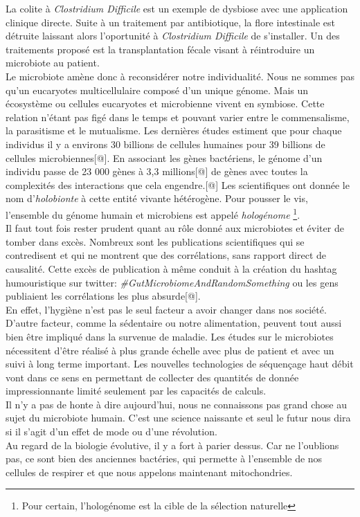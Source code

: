 \documentclass[12pt,a4paper]{article}
\begin{document}
La colite à \textit{Clostridium Difficile} est un exemple de dysbiose avec une application clinique directe. Suite à un traitement par antibiotique, la flore intestinale est détruite laissant alors l'oportunité à \textit{Clostridium Difficile} de s'installer. Un des traitements proposé est la transplantation fécale visant à réintroduire un microbiote au patient. \\
Le microbiote amène donc à reconsidérer notre individualité. Nous ne sommes pas qu’un eucaryotes multicellulaire composé d’un unique génome. Mais un écosystème ou cellules eucaryotes et microbienne vivent en symbiose. Cette relation n'étant pas figé dans le temps et pouvant varier entre le commensalisme, la parasitisme et le mutualisme. Les dernières études estiment que pour chaque individus il y a environs 30 billions de cellules humaines pour 39 billions de cellules microbiennes[@]. En associant les gènes bactériens, le génome d’un individu passe de 23 000 gènes à 3,3 millions[@] de gènes avec toutes la complexités des interactions que cela engendre.[@] Les scientifiques ont donnée le nom d’\textit{holobionte} à cette entité vivante hétérogène. Pour pousser le vis, l'ensemble du génome humain et microbiens est appelé \textit{hologénome} \footnote{Pour certain, l'hologénome est la cible de la sélection naturelle}. \\
Il faut tout fois rester prudent quant au rôle donné aux microbiotes et éviter de tomber dans excès. Nombreux sont les publications scientifiques qui se contredisent et qui ne montrent que des corrélations, sans rapport direct de causalité. Cette excès de publication à même conduit à la création du hashtag humouristique sur twitter: \textit{\#GutMicrobiomeAndRandomSomething} ou les gens publiaient les corrélations les plus absurde[@]. \\
En effet, l'hygiène n'est pas le seul facteur a avoir changer dans nos société. D'autre facteur, comme la sédentaire ou notre alimentation, peuvent tout aussi bien être impliqué dans la survenue de maladie.
Les études sur le microbiotes nécessitent d'être réalisé à plus grande échelle avec plus de patient et avec un suivi à long terme important. Les nouvelles technologies de séquençage haut débit vont dans ce sens en permettant de collecter des quantités de donnée impressionnante limité seulement par les capacités de calculs. \\
Il n’y a pas de honte à dire aujourd'hui, nous ne connaissons pas grand chose au sujet du microbiote humain. C’est une science naissante et seul le futur nous dira si il s’agit d’un effet de mode ou d’une révolution. \\
Au regard de la biologie évolutive, il y a fort à parier dessus. Car ne l'oublions pas, ce sont bien des anciennes bactéries, qui permette à l'ensemble de nos cellules de respirer et que nous appelons maintenant mitochondries.
\end{document}
